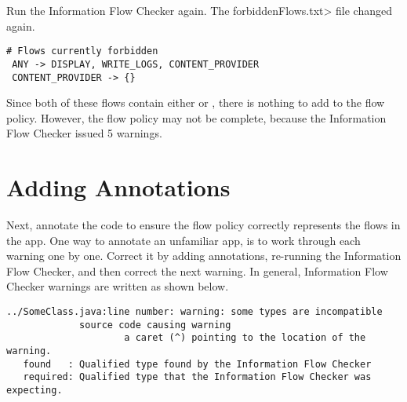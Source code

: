  
 Run the Information Flow Checker again. The \<forbiddenFlows.txt> file changed again.
\begin{Verbatim}
# Flows currently forbidden
 ANY -> DISPLAY, WRITE_LOGS, CONTENT_PROVIDER 
 CONTENT_PROVIDER -> {}
 \end{Verbatim}
 Since both of these flows contain either  or \perm{\{\}}, there is nothing to add 
 to the flow policy.  However, the flow policy may not be complete, because the Information Flow Checker
 issued 5 warnings.  



\section{Adding Annotations}

Next, annotate the code to ensure the flow policy correctly represents the flows
in the app.  One way to annotate an unfamiliar app, is to work through each warning
one by one. Correct it by adding annotations, re-running the Information Flow Checker, 
and then correct the next warning.  In general, 
Information Flow Checker warnings are written as shown below.

\begin{Verbatim}  
../SomeClass.java:line number: warning: some types are incompatible 
             source code causing warning
                     a caret (^) pointing to the location of the warning.
   found   : Qualified type found by the Information Flow Checker
   required: Qualified type that the Information Flow Checker was expecting.
\end{Verbatim}
 
